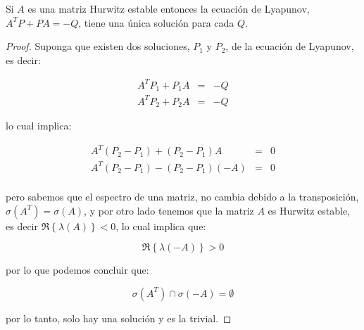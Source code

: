     \begin{corolario} \label{co:lyap2}
        Si $A$ es una matriz Hurwitz estable entonces la ecuación de Lyapunov, $A^T P + P A = -Q$, tiene una única solución para cada $Q$.
    \end{corolario}

    \begin{proof}
        Suponga que existen dos soluciones, $P_1$ y $P_2$, de la ecuación de Lyapunov, es decir:

        \begin{eqnarray*}
            A^T P_1 + P_1 A & = & -Q \\
            A^T P_2 + P_2 A & = & -Q
        \end{eqnarray*}

        lo cual implica:

        \begin{eqnarray*}
            A^T (P_2 - P_1) + (P_2 - P_1) A & = & 0 \\
            A^T (P_2 - P_1) - (P_2 - P_1) (-A) & = & 0 \\
        \end{eqnarray*}

        pero sabemos que el espectro de una matriz, no cambia debido a la transposición, $\sigma(A^T) = \sigma(A)$, y por otro lado tenemos que la matriz $A$ es Hurwitz estable, es decir $\Re{\left\{ \lambda(A)\right\}} < 0$, lo cual implica que:

        \begin{equation*}
            \Re{\left\{ \lambda(-A) \right\}} > 0
        \end{equation*}

        por lo que podemos concluir que:

        \begin{equation*}
            \sigma(A^T) \cap \sigma(-A) = \emptyset
        \end{equation*}

        por lo tanto, solo hay una solución y es la trivial.
    \end{proof}
